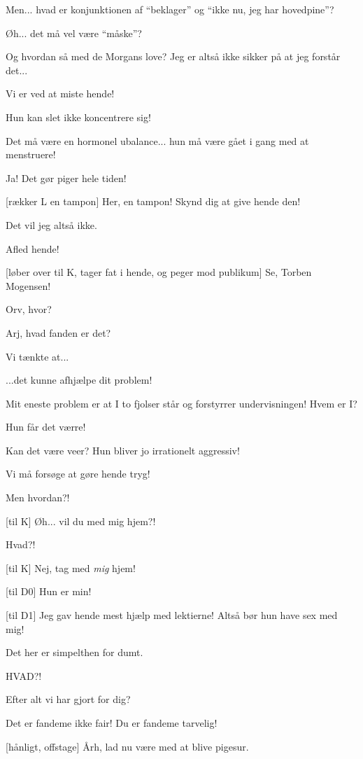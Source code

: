 \documentclass[a4paper,11pt]{article}
\begin{document}
\begin{sketch}
   Men... hvad er konjunktionen af "`beklager"' og "`ikke nu, jeg har hovedpine"'?

   Øh... det må vel være "`måske"'? 

   Og hvordan så med de Morgans love?  Jeg er altså ikke
  sikker på at jeg forstår det...


   Vi er ved at miste hende!

   Hun kan slet ikke koncentrere sig!

   Det må være en hormonel ubalance... hun må være gået i
  gang med at menstruere!

   Ja!  Det gør piger hele tiden!

  [rækker L en tampon] Her, en tampon!  Skynd dig at
  give hende den!

   Det vil jeg altså ikke.

   Afled hende!

  [løber over til K, tager fat i hende, og peger mod
  publikum]  Se, Torben Mogensen!

   Orv, hvor?


   Arj, hvad fanden er det?


   Vi tænkte at...

   ...det kunne afhjælpe dit problem!

   Mit eneste problem er at I to fjolser står og forstyrrer
  undervisningen!  Hvem er I?

   Hun får det værre!

   Kan det være veer?  Hun bliver jo irrationelt aggressiv!

   Vi må forsøge at gøre hende tryg!

   Men hvordan?!

  [til K] Øh... vil du med mig hjem?!

   Hvad?!

  [til K] Nej, tag med \textit{mig} hjem!

  [til D0] Hun er min!

  [til D1] Jeg gav hende mest hjælp med lektierne!  Altså bør
  hun have sex med mig!

   Det her er simpelthen for dumt. 

   HVAD?!

   Efter alt vi har gjort for dig?

   Det er fandeme ikke fair!  Du er fandeme tarvelig!

  [hånligt, offstage] Årh, lad nu være med at blive pigesur.
\end{sketch}
\end{document}
